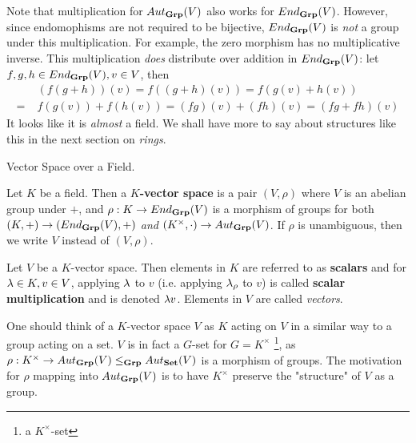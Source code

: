 \documentclass[../book.tex]{subfiles}
\begin{document}
\begin{rmk}
    Note that multiplication for $Aut_{\mathbf{Grp}}(V)$ also works for $End_{\mathbf{Grp}}(V)$.
    However, since endomophisms are not required to be bijective, 
    $End_{\mathbf{Grp}}(V)$ is \emph{not} a group under this multiplication. 
    For example, the zero morphism has no multiplicative inverse. 
    This multiplication \emph{does} distribute over addition in $End_{\mathbf{Grp}}(V)$: let $f, g, h \in End_{\mathbf{Grp}}(V), v \in V$, then
    \begin{align*}
        &(f(g + h))(v) = f((g+h)(v)) = f(g(v) + h(v)) \\
        =\;& f(g(v)) + f(h(v)) = (fg)(v) + (fh)(v) = (fg + fh)(v)
    \end{align*}
    It looks like it is \emph{almost} a field. 
    We shall have more to say about structures like this 
    in the next section on \emph{rings}. 
\end{rmk}

\begin{dfn} Vector Space over a Field. 

    Let $K$ be a field. 
    Then a \textbf{$K$-vector space} is a pair $(V,\rho)$
    where $V$ is an abelian group under $+$, 
    and $\rho : K \to End_{\mathbf{Grp}}(V)$ is a morphism of groups for both
    $(K,+) \to (End_{\mathbf{Grp}}(V),+)$ \emph{and} 
    $(K^\times,\cdot) \to Aut_{\mathbf{Grp}}(V)$.
    If $\rho$ is unambiguous, then we write $V$ instead of $(V,\rho)$. 
    
    Let $V$ be a $K$-vector space. 
    Then elements in $K$ are referred to as \textbf{scalars}
    and for $\lambda \in K, v \in V$, applying $\lambda$ to $v$ 
    (i.e. applying $\lambda_\rho$ to $v$) is called
    \textbf{scalar multiplication} and is denoted $\lambda v$. 
    Elements in $V$ are called \emph{vectors}. 

\end{dfn}

\begin{rmk}
    One should think of a $K$-vector space $V$ as $K$ acting on $V$
    in a similar way to a group acting on a set. 
    $V$ is in fact a $G$-set for $G=K^\times$
    \footnote{a $K^\times$-set}, 
    as $\rho : K^\times \to Aut_{\mathbf{Grp}}(V) \leq_{\mathbf{Grp}} Aut_{\mathbf{Set}}(V)$
    is a morphism of groups. 
    The motivation for $\rho$ mapping into $Aut_{\mathbf{Grp}}(V)$ is
    to have $K^\times$ preserve the "structure" of $V$ as a group. 
    
\end{rmk}
\end{document}
